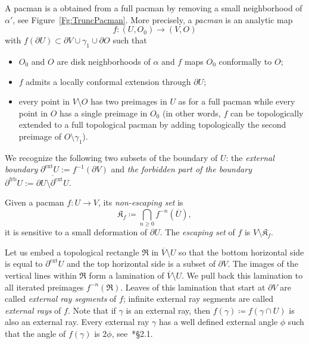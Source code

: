 \documentclass{amsart}
\newcommand{\1}{{\mathbb 1 }}
\newcommand\Kfilled{{\mathfrak K}}
\newcommand{\Rect}{{\mathfrak R }}
\newcommand\ext{{\operatorname{ext}}}
\newcommand\frb{{\operatorname{frb}}}
\theoremstyle{remark}
\numberwithin{equation}{section}
\theoremstyle{definition}
\theoremstyle{nonumberbreak}
\begin{document}
A pacman is a obtained from a full pacman by removing a small neighborhood of $\alpha'$, see Figure~\ref{Fg:TruncPacman}.  More precisely, a \emph{pacman} is an analytic map
\begin{equation}
\label{eq:TrunPacm}
f\colon (U, O_0)\to (V,O)
\end{equation}
with $f(\partial U)\subset \partial V \cup \gamma_1\cup \partial O$ such that
\begin{itemize}
\item $O_0$ and $O$ are disk neighborhoods of $\alpha$ and $f$ maps $O_0$ conformally to $O$;
\item $f$ admits a locally conformal extension through $\partial U$;
\item every point in $V\setminus O$ has two preimages in $U$ as for a full pacman while every point in $O$ has a single preimage in $O_0$ (in other words, $f$ can be topologically extended to a full topological pacman by adding topologically the second preimage of $O\setminus \gamma_1$).
\end{itemize}

We recognize the following two subsets of the boundary of $U$:  the \emph{external boundary} $\partial^{\ext} U := f^{-1}(\partial V)$ and \emph{the forbidden part of the boundary} $\partial^{\frb} U:= \overline {\partial U\setminus \partial^{\ext} U}$. 



Given a pacman $f\colon U\to V$, its \emph{non-escaping set} is \[\Kfilled_f\coloneqq \bigcap_{n\ge 0} f^{-n}\left(\overline U\right),\]
it is sensitive to a small deformation of $\partial U$. The \emph{escaping set} of $f$ is $V\setminus \Kfilled_f$. 

 Let us embed a topological rectangle $\Rect$ in $\overline{V} \setminus U$ so that the bottom horizontal side is equal to $\partial^{\ext} U $ and the top horizontal side is a subset of $\partial V$. The images of the vertical lines within $\Rect$ form a lamination of $\overline{V} \setminus U$. We pull back this lamination to all iterated preimages $f^{-n}(\Rect)$. Leaves of this lamination that start at $\partial V$ are called \emph{external ray segments} of  $f$; infinite external ray segments are called \emph{external rays} of $f$. Note that if $\gamma$ is an external ray, then $f(\gamma)\coloneqq f(\gamma\cap U)$ is also an external ray. Every external ray $\gamma$ has a well defined external angle $\phi$ such that the angle of $f(\gamma)$ is $2\phi$, see~\cite{DLS}*{\S 2.1}. 
\end{document}
